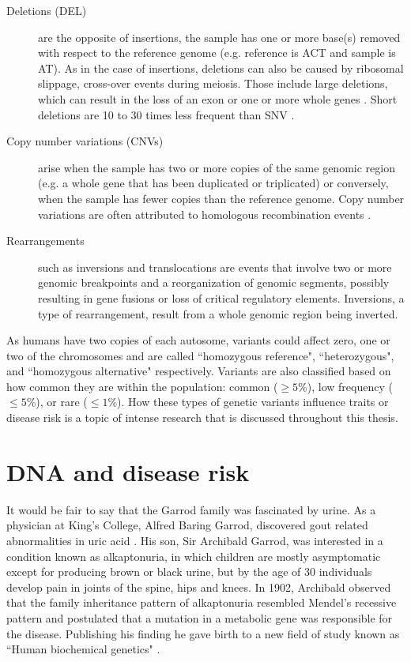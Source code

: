 \begin{description}
	\item[Deletions (DEL)] are the opposite of insertions, the sample has one or more base(s) removed with respect to the reference genome (e.g. reference is ACT and sample is AT). 
	As in the case of insertions, deletions can also be caused by ribosomal slippage, cross-over events during meiosis. 
	Those include large deletions, which can result in the loss of an exon or one or more whole genes \cite{alberts1995molecular}. 
	Short deletions are 10 to 30 times less frequent than SNV \cite{10002012integrated}.

	\item[Copy number variations (CNVs)] arise when the sample has two or more copies of the same genomic region (e.g. a whole gene that has been duplicated or triplicated) or conversely, when the sample has fewer copies than the reference genome. Copy number variations are often attributed to homologous recombination events \cite{alberts1995molecular}.

	\item[Rearrangements] such as inversions and translocations are events that involve two or more genomic breakpoints and a reorganization of genomic segments, possibly resulting in gene fusions or loss of critical regulatory elements. Inversions, a type of rearrangement, result from a whole genomic region being inverted.

\end{description}

\noindent As humans have two copies of each autosome, variants could affect zero, one or two of the chromosomes and are called ``homozygous reference", ``heterozygous", and ``homozygous alternative" respectively. 
Variants are also classified based on how common they are within the population: common ($\ge 5\%$), low frequency ($\le 5\%$), or rare ($\le 1\%$). 
How these types of genetic variants influence traits or disease risk is a topic of intense research that is discussed throughout this thesis.

\section{DNA and disease risk}

It would be fair to say that the Garrod family was fascinated by urine. 
As a physician at King's College, Alfred Baring Garrod, discovered gout related abnormalities in uric acid \cite{kennedy2001}. 
His son, Sir Archibald Garrod, was interested in a condition known as alkaptonuria, in which children are mostly asymptomatic except for producing brown or black urine, but by the age of 30 individuals develop pain in joints of the spine, hips and knees. 
In 1902, Archibald observed that the family inheritance pattern of alkaptonuria resembled Mendel's recessive pattern and postulated that a mutation in a metabolic gene was responsible for the disease. 
Publishing his finding he gave birth to a new field of study known as ``Human biochemical genetics" \cite{kennedy2001}.

